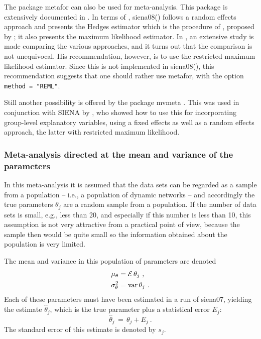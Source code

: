 \documentclass[a4paper,fleqn,11pt]{article}
\newcommand{\var}{\mbox{var}}
\newcommand{\+}{\, + \,}
\newcommand{\E}{\mbox{$\cal E$}}
\newcommand{\sfn}[1]{\textsf{#1}}
\newcommand{\SI}{{\sf SIENA }}
\begin{document}
The package \sfn{metafor} can also be used for meta-analysis.
This package is extensively documented in \citet{Viechtbauer2010}.
In terms of \citet{Viechtbauer2010}, \sfn{siena08()} follows a
random effects approach and presents the Hedges estimator
which is the procedure of \citet{SnijdersBaerveldt03}, proposed
by \citet{Cochran54}; it also presents the maximum likelihood
estimator.
In \citet{Viechtbauer2005}, an extensive study is made comparing
the various approaches, and it turns out that the comparison is
not unequivocal. His recommendation, however, is to use the
restricted maximum likelihood estimator.
Since this is not implemented in \sfn{siena08()}, this recommendation
suggests that one should rather use  \sfn{metafor}, with the
option \texttt{method = "REML"}.

Still another possibility is offered by the package \sfn{mvmeta}
\citep{Gasparrini2012}.
This was used in conjunction with \SI by
\citet{An2015}, who showed how to use this for incorporating
group-level explanatory variables, using a fixed effects
as well as a random effects approach, the latter with
restricted maximum likelihood.

\subsubsection{Meta-analysis directed at the mean
               and variance of the parameters}

In this meta-analysis it is assumed that the data sets can be
regarded as a sample from a population -- i.e., a population
of dynamic networks -- and accordingly the true parameters
$\theta_j$  are a random sample from a population.
If the number of data sets is small, e.g., less than 20,
and especially if this number is less than 10,
this assumption is not very attractive from a practical point of view,
because the sample then would be quite small
so the information obtained about the population is very limited.

The mean and variance in this population of parameters are denoted
\begin{align*}
 \mu_\theta &= \E\, \theta_j \ , \\
 \sigma^2_\theta &= \var\, \theta_j \ .
\end{align*}
Each of these parameters must have been estimated in a run of
\textsf{siena07}, yielding the estimate $\hat\theta_j$,
which is the true parameter plus a statistical error $E_j$:
\[
\hat\theta_j \,=\, \theta_j + E_j \ .
\]
The standard error of this estimate is denoted by $s_j$.
\end{document}
